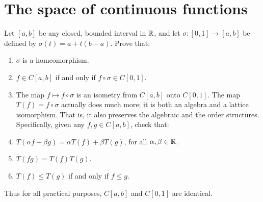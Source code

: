 \section{The space of continuous functions}


\begin{exercise}{63}
Let $[a,b]$ be any closed, bounded interval in $\mathbb{R}$, and let $\sigma:[0,1]\to[a,b]$ be defined by $\sigma(t)= a + t(b-a)$.
Prove that:
\begin{enumerate}
    \item $\sigma$ is a homeomorphism.
    \item $f\in C[a,b]$ if and only if $f\circ \sigma\in C[0,1]$.
    \item The map $f\mapsto f \circ \sigma$ is an isometry from $C[a,b]$ onto $C[0,1]$.
    The map $T(f) = f \circ \sigma$ actually does much more;
    it is both an algebra and a lattice isomorphism.
    That is, it also preserves the algebraic and the order structures.
    Specifically, given any $f,g\in C[a,b]$, check that:
    \item $T(\alpha f + \beta g) = \alpha T(f) + \beta T(g)$, for all $\alpha,\beta\in\mathbb{R}$.
    \item $T(fg)=T(f)T(g)$.
    \item $T(f) \leq T(g)$ if and only if $f\leq g$.
\end{enumerate}
Thus for all practical purposes, $C[a,b]$ and $C[0,1]$ are identical.
\end{exercise}
